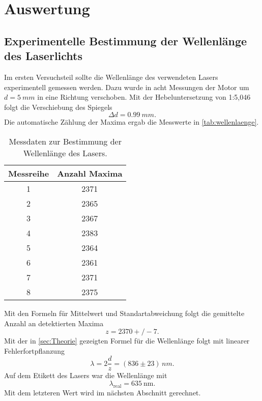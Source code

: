 \section{Auswertung}
\label{sec:Auswertung}

\subsection{Experimentelle Bestimmung der Wellenlänge des Laserlichts}
\label{sec:Experimentelle Bestimmung der Wellenlänge des Laserlichts}
Im ersten Versuchsteil sollte die Wellenlänge des verwendeten Lasers experimentell
gemessen werden. Dazu wurde in acht Messungen der Motor um $d = \SI{5}{mm}$ in eine
Richtung verschoben. Mit der Hebeluntersetzung von 1:5,046 folgt die Verschiebung 
des Spiegels
\begin{equation}
	\Delta d = \SI{0,99}{mm}.
\end{equation}
Die automatische Zählung der Maxima ergab die Messwerte in \autoref{tab:wellenlaenge}.
\begin{table}
  \centering
  \caption{Messdaten zur Bestimmung der Wellenlänge des Lasers.}
  \label{tab:wellenlaenge}
  \begin{tabular}{c c}
  \toprule
  Messreihe & Anzahl Maxima\\
  \midrule
    1 & 2371 \\
    2 & 2365 \\
    3 & 2367 \\
    4 & 2383 \\
    5 & 2364 \\
    6 & 2361 \\
    7 & 2371 \\
    8 & 2375 \\
  \bottomrule
  \end{tabular}
\end{table}
Mit den Formeln für Mittelwert und Standartabweichung folgt die gemittelte Anzahl an
detektierten Maxima
\begin{equation}
	z = 2370+/-7.
\end{equation}
Mit der in \autoref{sec:Theorie} gezeigten Formel für die Wellenlänge folgt mit linearer
Fehlerfortpflanzung 
\begin{equation}
	\lambda = 2 \frac{d}{z} = (836 \pm 23) \, \si{nm}.
\end{equation}
Auf dem Etikett des Lasers war die Wellenlänge mit
\begin{equation}
	\label{eqn:wellenlaenge-real}
	\lambda_\text{real} = \SI{635}{\nano\meter}.
\end{equation}
Mit dem letzteren Wert wird im nächsten Abschnitt gerechnet.

